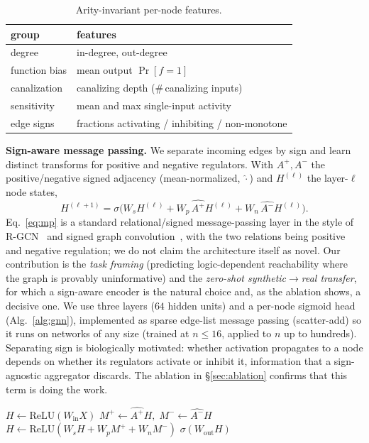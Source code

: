 \documentclass[journal]{IEEEtran}
\begin{document}
\begin{table}[t]
\caption{Arity-invariant per-node features.}
\label{tab:feats}
\centering
\begin{tabular}{ll}
\toprule
group & features\\
\midrule
degree & in-degree, out-degree\\
function bias & mean output $\Pr[f{=}1]$\\
canalization & canalizing depth (\#\,canalizing inputs)\\
sensitivity & mean and max single-input activity\\
edge signs & fractions activating / inhibiting / non-monotone\\
\bottomrule
\end{tabular}
\end{table}

\textbf{Sign-aware message passing.} We separate incoming edges by sign and learn
distinct transforms for positive and negative regulators. With $A^{+},A^{-}$ the
positive/negative signed adjacency (mean-normalized, $\widehat{\cdot}$) and $H^{(\ell)}$
the layer-$\ell$ node states,
\begin{equation}
H^{(\ell+1)} = \sigma\!\big(W_s H^{(\ell)} + W_p\,\widehat{A^{+}}H^{(\ell)} +
W_n\,\widehat{A^{-}}H^{(\ell)}\big).
\label{eq:mp}
\end{equation}
Eq.~\eqref{eq:mp} is a standard relational/signed message-passing layer in the style of
R-GCN~\cite{rgcn} and signed graph convolution~\cite{signedgcn}, with the two relations
being positive and negative regulation; we do not claim the architecture itself as novel.
Our contribution is the \emph{task framing} (predicting logic-dependent reachability where
the graph is provably uninformative) and the \emph{zero-shot synthetic$\to$real transfer},
for which a sign-aware encoder is the natural choice and, as the ablation shows, a
decisive one. We use
three layers ($64$ hidden units) and a per-node sigmoid head (Alg.~\ref{alg:gnn}),
implemented as sparse edge-list message passing (scatter-add) so it runs on networks of
any size (trained at $n\le16$, applied to $n$ up to hundreds). Separating sign is
biologically motivated: whether activation propagates to a node depends on whether its
regulators activate or inhibit it, information that a sign-agnostic aggregator discards. The
ablation in \S\ref{sec:ablation} confirms that this term is doing the work.

\begin{algorithm}[t]
\caption{Sign-aware GNN forward pass (per-node head)}
\label{alg:gnn}
\begin{algorithmic}[1]
\State $H\gets\mathrm{ReLU}(W_\text{in}X)$ 
  \State $M^+\!\gets\!\widehat{A^+}H,\;M^-\!\gets\!\widehat{A^-}H$ 
  \State $H\gets\mathrm{ReLU}(W_s H + W_p M^+ + W_n M^-)$
\EndFor
\State \Return $\sigma(W_\text{out}H)$ 
\end{algorithmic}
\end{algorithm}
\end{document}
